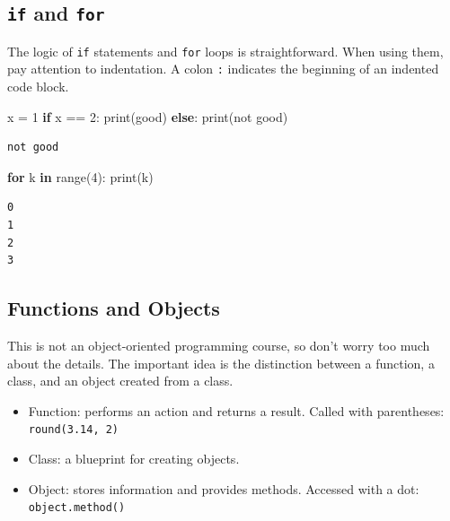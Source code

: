 \documentclass[
  letterpaper,
  DIV=11,
  numbers=noendperiod]{scrreprt}
\newenvironment{Shaded}{\begin{snugshade}}{\end{snugshade}}
\newcommand{\BuiltInTok}[1]{\textcolor[rgb]{0.00,0.23,0.31}{#1}}
\newcommand{\ControlFlowTok}[1]{\textcolor[rgb]{0.00,0.23,0.31}{\textbf{#1}}}
\newcommand{\DecValTok}[1]{\textcolor[rgb]{0.68,0.00,0.00}{#1}}
\newcommand{\KeywordTok}[1]{\textcolor[rgb]{0.00,0.23,0.31}{\textbf{#1}}}
\newcommand{\NormalTok}[1]{\textcolor[rgb]{0.00,0.23,0.31}{#1}}
\newcommand{\OperatorTok}[1]{\textcolor[rgb]{0.37,0.37,0.37}{#1}}
\newcommand{\StringTok}[1]{\textcolor[rgb]{0.13,0.47,0.30}{#1}}
\providecommand{\tightlist}{%
  \setlength{\itemsep}{0pt}\setlength{\parskip}{0pt}}
\theoremstyle{definition}
\theoremstyle{definition}
\theoremstyle{plain}
\theoremstyle{plain}
\theoremstyle{remark}
\begin{document}
\subsection{\texorpdfstring{\texttt{if} and
\texttt{for}}{if and for}}\label{if-and-for}

The logic of \texttt{if} statements and \texttt{for} loops is
straightforward. When using them, pay attention to indentation. A colon
\texttt{:} indicates the beginning of an indented code block.

\begin{Shaded}
\begin{Highlighting}[]
\NormalTok{x }\OperatorTok{=} \DecValTok{1}
\ControlFlowTok{if}\NormalTok{ x }\OperatorTok{==} \DecValTok{2}\NormalTok{:}
    \BuiltInTok{print}\NormalTok{(}\StringTok{\textquotesingle{}good\textquotesingle{}}\NormalTok{)}
\ControlFlowTok{else}\NormalTok{:}
    \BuiltInTok{print}\NormalTok{(}\StringTok{\textquotesingle{}not good\textquotesingle{}}\NormalTok{)}
\end{Highlighting}
\end{Shaded}

\begin{verbatim}
not good
\end{verbatim}

\begin{Shaded}
\begin{Highlighting}[]
\ControlFlowTok{for}\NormalTok{ k }\KeywordTok{in} \BuiltInTok{range}\NormalTok{(}\DecValTok{4}\NormalTok{):}
    \BuiltInTok{print}\NormalTok{(k)}
\end{Highlighting}
\end{Shaded}

\begin{verbatim}
0
1
2
3
\end{verbatim}

\subsection{Functions and Objects}\label{functions-and-objects}

This is not an object-oriented programming course, so don't worry too
much about the details. The important idea is the distinction between a
function, a class, and an object created from a class.

\begin{itemize}
\tightlist
\item
  Function: performs an action and returns a result. Called with
  parentheses: \texttt{round(3.14,\ 2)}
\item
  Class: a blueprint for creating objects.
\item
  Object: stores information and provides methods. Accessed with a dot:
  \texttt{object.method()}
\end{itemize}
\end{document}
